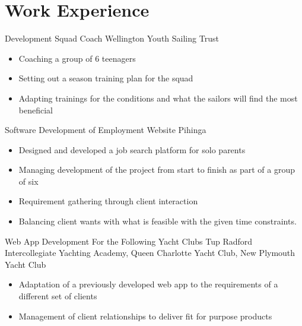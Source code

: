 \documentclass[a4paper]{template} %
\begin{document}

\section{Work Experience}

\begin{workexperience} %
    {Development Squad Coach}
    {Wellington Youth Sailing Trust}
    {
        \begin{itemize}
            \item Coaching a group of 6 teenagers
            \item Setting out a season training plan for the squad
            \item Adapting trainings for the conditions and what the sailors will find the most beneficial 
        \end{itemize}
    }

    {Software Development of Employment Website}
    {Pihinga}
    {
        \begin{itemize}
            \item Designed and developed a job search platform for solo parents
            \item Managing development of the project from start to finish as part of a group of six
            \item Requirement gathering through client interaction
            \item Balancing client wants with what is feasible with the given time constraints.
        \end{itemize}
    }

    {Web App Development For the Following Yacht Clubs}
    {Tup Radford Intercollegiate Yachting Academy, Queen Charlotte Yacht Club, New Plymouth Yacht Club}
    {
        \begin{itemize}
            \item Adaptation of a previously developed web app to the requirements of a different set of clients
            \item Management of client relationships to deliver fit for purpose products
        \end{itemize}
    }


\end{workexperience}
\end{document}
